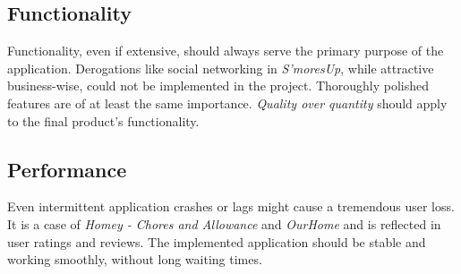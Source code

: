 \subsection{Functionality}\label{subsec:market:conclusions:functionality}
Functionality, even if extensive, should always serve the primary purpose of the application. Derogations like social networking in \textit{S'moresUp}, while attractive business-wise, could not be implemented in the project. Thoroughly polished features are of at least the same importance. \textit{Quality over quantity} should apply to the final product's functionality.


\subsection{Performance}\label{subsec:market:conclusions:performance}
Even intermittent application crashes or lags might cause a tremendous user loss. It is a case of \textit{Homey - Chores and Allowance} and \textit{OurHome} and is reflected in user ratings and reviews. The implemented application should be stable and working smoothly, without long waiting times.